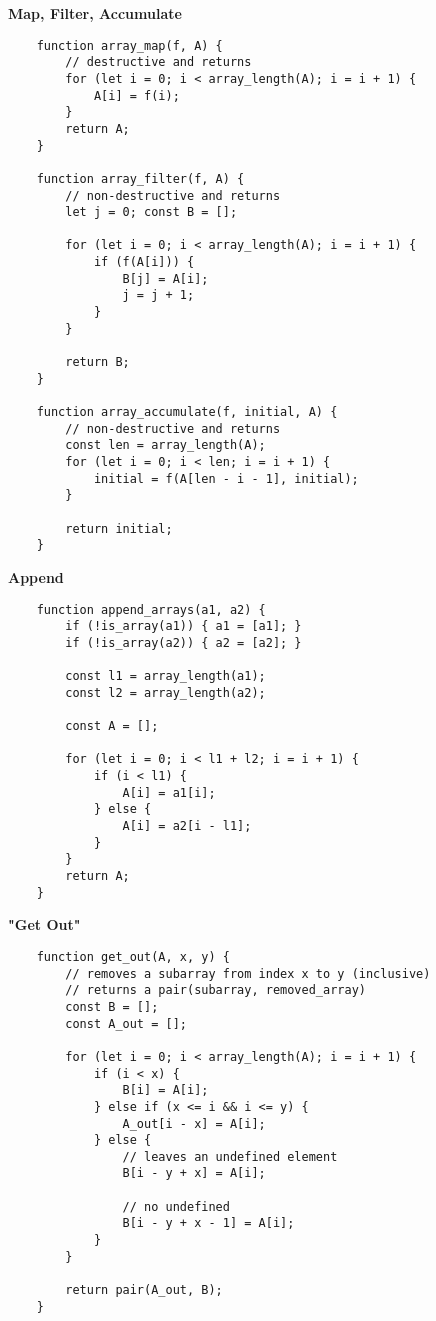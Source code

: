 \documentclass[a4paper]{article} \usepackage[backend=biber, style=numeric, sorting=none]{biblatex}
\begin{document}
\pagebreak

\textbf{Map, Filter, Accumulate}
\begin{verbatim}
    function array_map(f, A) {
        // destructive and returns
        for (let i = 0; i < array_length(A); i = i + 1) {
            A[i] = f(i);
        }
        return A;
    }
    
    function array_filter(f, A) {
        // non-destructive and returns
        let j = 0; const B = [];
        
        for (let i = 0; i < array_length(A); i = i + 1) {
            if (f(A[i])) {
                B[j] = A[i];
                j = j + 1;
            }
        }
        
        return B;
    }
    
    function array_accumulate(f, initial, A) {
        // non-destructive and returns
        const len = array_length(A);
        for (let i = 0; i < len; i = i + 1) {
            initial = f(A[len - i - 1], initial);
        }
        
        return initial;
    }
\end{verbatim}
\textbf{Append}

\begin{verbatim}
    function append_arrays(a1, a2) {
        if (!is_array(a1)) { a1 = [a1]; }
        if (!is_array(a2)) { a2 = [a2]; }
        
        const l1 = array_length(a1);
        const l2 = array_length(a2);
        
        const A = [];
        
        for (let i = 0; i < l1 + l2; i = i + 1) {
            if (i < l1) {
                A[i] = a1[i];
            } else {
                A[i] = a2[i - l1];
            }
        }
        return A;
    }    
\end{verbatim}

\pagebreak

\textbf{"Get Out"}
\begin{verbatim}
    function get_out(A, x, y) {
        // removes a subarray from index x to y (inclusive)
        // returns a pair(subarray, removed_array)
        const B = [];
        const A_out = [];
        
        for (let i = 0; i < array_length(A); i = i + 1) {
            if (i < x) {
                B[i] = A[i];
            } else if (x <= i && i <= y) {
                A_out[i - x] = A[i];
            } else {
                // leaves an undefined element
                B[i - y + x] = A[i];
                
                // no undefined
                B[i - y + x - 1] = A[i];
            }
        }
        
        return pair(A_out, B);
    }
\end{verbatim}
\end{document}
